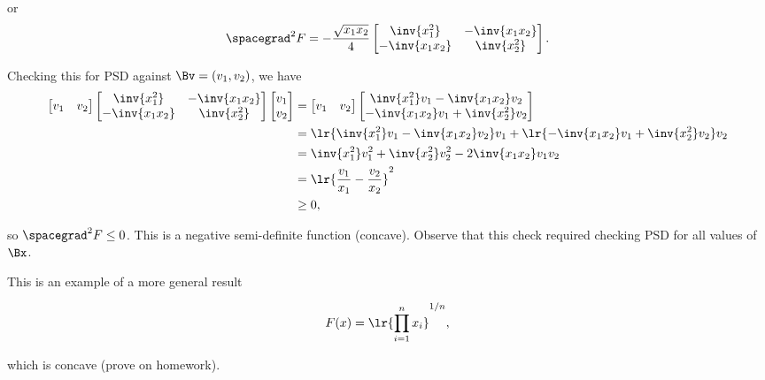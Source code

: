 or
\begin{dmath}\label{eqn:convexOptimizationLecture7:340}
\spacegrad^2 F
=
-\frac{\sqrt{x_1 x_2}}{4}
\begin{bmatrix}
\inv{x_1^2} & -\inv{x_1 x_2} \\
-\inv{x_1 x_2} & \inv{x_2^2}
\end{bmatrix}.
\end{dmath}

Checking this for PSD against \( \Bv = (v_1, v_2) \), we have
\begin{dmath}\label{eqn:convexOptimizationLecture7:360}
\begin{aligned}
\begin{bmatrix}
v_1 & v_2
\end{bmatrix}
\begin{bmatrix}
\inv{x_1^2} & -\inv{x_1 x_2} \\
-\inv{x_1 x_2} & \inv{x_2^2}
\end{bmatrix}
\begin{bmatrix}
v_1 \\ v_2
\end{bmatrix}
&=
\begin{bmatrix}
v_1 & v_2
\end{bmatrix}
\begin{bmatrix}
\inv{x_1^2} v_1 -\inv{x_1 x_2} v_2  \\
-\inv{x_1 x_2} v_1 + \inv{x_2^2} v_2
\end{bmatrix} \\
&=
\lr{ \inv{x_1^2} v_1 -\inv{x_1 x_2} v_2 } v_1 +
\lr{ -\inv{x_1 x_2} v_1 + \inv{x_2^2} v_2 } v_2 
\\
&=
\inv{x_1^2} v_1^2 
+ \inv{x_2^2} v_2^2
-2 \inv{x_1 x_2} v_1 v_2  \\
&=
\lr{
\frac{v_1}{x_1}
-\frac{v_2}{x_2}
}^2 \\
&\ge 0,
\end{aligned}
\end{dmath}

so \( \spacegrad^2 F \le 0 \).  This is a negative semi-definite function (concave).  Observe that this check required checking PSD for all values of \( \Bx \).

This is an example of a more general result

\begin{dmath}\label{eqn:convexOptimizationLecture7:380}
F(x) = \lr{ \prod_{i = 1}^n x_i }^{1/n},
\end{dmath}

which is concave (prove on homework).

